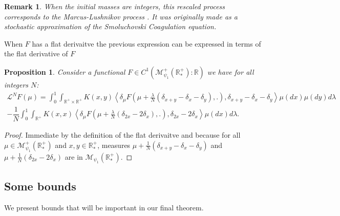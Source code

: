 \documentclass[11pt,a4paper]{article}
\newcommand{\RR}{\mathbb{R}}
\newcommand{\RRP}{\mathbb{R}^+_*}
\newcommand{\MC}{\mathcal{M}}
\newcommand{\LC}{\mathcal{L}}
\newtheorem{remark}[theorem]{Remark}
\newtheorem{proposition}[theorem]{Proposition}
\begin{document}
\begin{remark}
   When the initial masses are integers, this rescaled process corresponds to the Marcus-Lushnikov process \cite{marcus1968stochastic,lushnikov1978coagulation}. It was originally made as a stochastic approximation of the Smoluchovski Coagulation equation.
\end{remark}
When $F$ has a flat derivaitve the previous expression can be expressed in terms of the flat derivative of $F$
\begin{proposition}\label{prop:SC_gen_differentiable}
    Consider a functional $F \in C^1(\MC_{\psi_1}^+\left(\RRP \right):\RR)$ we have for all integers $N$:
    \begin{multline*}
        \LC^N F(\mu) = \int_0^1 \int_{\RR^+ \times \RR^+} K(x,y)\left\langle  \delta_\mu F\left(\mu + \frac{\lambda}{N}\left(\delta_{x + y} - \delta_x - \delta_y \right),.\right),\delta_{x+y} - \delta_x - \delta_y\right\rangle\mu(dx)\mu(dy)d\lambda \\
        -\dfrac{1}{N}\int_0^1\int_{\RR^+} K(x,x)\left\langle  \delta_\mu F\left(\mu + \frac{\lambda}{N}\left(\delta_{2x} - 2\delta_x \right),.\right),\delta_{2x} - 2\delta_x \right\rangle\mu(dx)d\lambda.
    \end{multline*}
\end{proposition}
\begin{proof}
    Immediate by the definition of the flat derivaitve and because for all $\mu \in \MC_{\psi_1}^+\left(\RRP \right)$ and $x,y \in \RRP$, measures $\mu + \frac{1}{N}\left(\delta_{x + y} - \delta_x - \delta_y\right)$ and $\mu + \frac{1}{N}\left(\delta_{2x} - 2\delta_x \right)$ are in $\MC_{\psi_1}\left(\RRP \right)$.
\end{proof}

\subsection{Some bounds}
We present bounds that will be important in our final theorem. 
\end{document}
